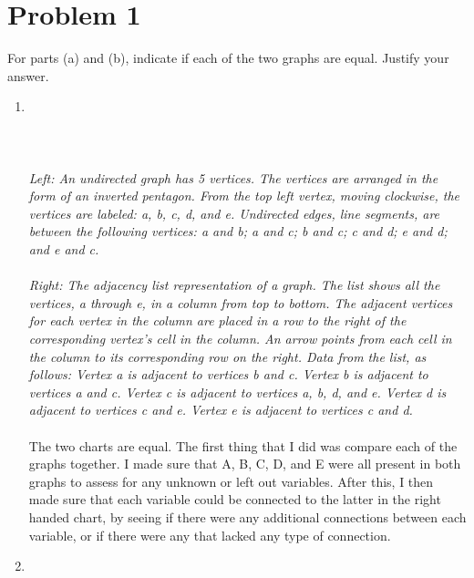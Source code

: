 \section*{Problem 1}


For parts (a) and (b), indicate if each of the two graphs are equal. Justify your answer.\\
 \begin{enumerate}[label=(\alph*)]
 

  \item
\hfil
\\\\
\\\\
 {\color{blue}{\bf Figure 1:} \emph{Left: An undirected graph has 5 vertices. The vertices are arranged in the form of an inverted pentagon. From the top left vertex, moving clockwise, the vertices are labeled: a, b, c, d, and e. Undirected edges, line segments, are between the following vertices: a and b; a and c; b and c; c and d; e and d; and e and c. \\
 }
 }\\
{\color{blue}{\bf Figure 2:} \emph{
  Right: The adjacency list representation of a graph. The list shows all the vertices, a through e, in a column from top to bottom. The adjacent vertices for each vertex in the column are placed in a row to the right of the corresponding vertex’s cell in the column. An arrow points from each cell in the column to its corresponding row on the right. Data from the list, as follows: Vertex a is adjacent to vertices b and c. Vertex b is adjacent to vertices a and c. Vertex c is adjacent to vertices a, b, d, and e. Vertex d is adjacent to vertices c and e. Vertex e is adjacent to vertices c and d.
}
}
\\\\
The two charts are equal. The first thing that I did was compare each of the graphs together. I made sure that A, B, C, D, and E were all present in both graphs to assess for any unknown or left out variables. After this, I then made sure that each variable could be connected to the latter in the right handed chart, by seeing if there were any additional connections between each variable, or if there were any that lacked any type of connection.
\newpage
 \item

\end{enumerate}
